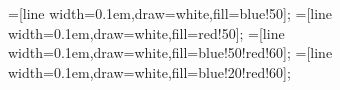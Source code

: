 =[line width=0.1em,draw=white,fill=blue!50];
=[line width=0.1em,draw=white,fill=red!50];
=[line width=0.1em,draw=white,fill=blue!50!red!60];
=[line width=0.1em,draw=white,fill=blue!20!red!60];
